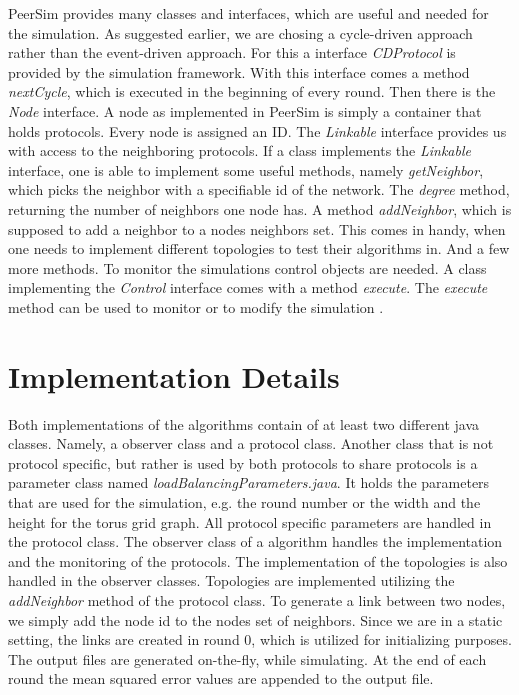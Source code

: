 PeerSim provides many classes and interfaces, which are useful and needed for the simulation. As suggested earlier, we are chosing a cycle-driven approach rather than the event-driven approach. For this a interface \textit{CDProtocol} is provided by the simulation framework. With this interface comes a method \textit{nextCycle}, which is executed in the beginning of every round. Then there is the \textit{Node} interface. A node as implemented in PeerSim is simply a container that holds protocols. Every node is assigned an ID. The \textit{Linkable} interface provides us with access to the neighboring protocols. If a class implements the \textit{Linkable} interface, one is able to implement some useful methods, namely \textit{getNeighbor}, which picks the neighbor with a specifiable id of the network. The \textit{degree} method, returning the number of neighbors one node has. A method \textit{addNeighbor}, which is supposed to add a neighbor to a nodes neighbors set. This comes in handy, when one needs to implement different topologies to test their algorithms in. And a few more methods. To monitor the simulations control objects are needed. A class implementing the \textit{Control} interface comes with a method \textit{execute}. The \textit{execute} method can be used to monitor or to modify the simulation \cite{peersimdocs}.

\section{Implementation Details}
Both implementations of the algorithms contain of at least two different java classes. Namely, a observer class and a protocol class. Another class that is not protocol specific, but rather is used by both protocols to share protocols is a parameter class named \textit{loadBalancingParameters.java}. It holds the parameters that are used for the simulation, e.g. the round number or the width and the height for the torus grid graph. All protocol specific parameters are handled in the protocol class. The observer class of a algorithm handles the implementation and the monitoring of the protocols. The implementation of the topologies is also handled in the observer classes. Topologies are implemented utilizing the \textit{addNeighbor} method of the protocol class. To generate a link between two nodes, we simply add the node id to the nodes set of neighbors. Since we are in a static setting, the links are created in round 0, which is utilized for initializing purposes. The output files are generated on-the-fly, while simulating. At the end of each round the mean squared error values are appended to the output file.

